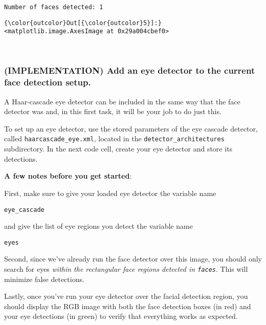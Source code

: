 \documentclass[11pt]{article}
\begin{document}
    \begin{Verbatim}[commandchars=\\\{\}]
Number of faces detected: 1

    \end{Verbatim}

\begin{Verbatim}[commandchars=\\\{\}]
{\color{outcolor}Out[{\color{outcolor}5}]:} <matplotlib.image.AxesImage at 0x29a004cbef0>
\end{Verbatim}
            
    \begin{center}
    \end{center}
    { \hspace*{\fill} \\}
    
    \subsubsection{(IMPLEMENTATION) Add an eye detector to the current face
detection
setup.}\label{implementation-add-an-eye-detector-to-the-current-face-detection-setup.}

A Haar-cascade eye detector can be included in the same way that the
face detector was and, in this first task, it will be your job to do
just this.

    To set up an eye detector, use the stored parameters of the eye cascade
detector, called \texttt{haarcascade\_eye.xml}, located in the
\texttt{detector\_architectures} subdirectory. In the next code cell,
create your eye detector and store its detections.

\textbf{A few notes before you get started}:

First, make sure to give your loaded eye detector the variable name

\texttt{eye\_cascade}

and give the list of eye regions you detect the variable name

\texttt{eyes}

Second, since we've already run the face detector over this image, you
should only search for eyes \emph{within the rectangular face regions
detected in \texttt{faces}}. This will minimize false detections.

Lastly, once you've run your eye detector over the facial detection
region, you should display the RGB image with both the face detection
boxes (in red) and your eye detections (in green) to verify that
everything works as expected.
\end{document}
